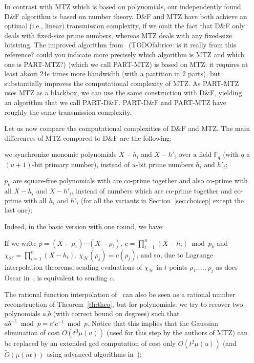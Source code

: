 \documentclass[twoside,envcountsame,runningheads]{llncs}
\newcommand{\Oapp}{\ensuremath{\tilde{O}}}
\newcommand{\Set}{\mathcal{H}}
\newcommand{\df}{D\&F\xspace}
\begin{document}
In contrast with MTZ which is based on polynomials, our
independently found \df algorithm is based on number theory.
\df and MTZ have both achieve an optimal (i.e., linear) transmission complexity, if we omit the fact
that \df only deals with fixed-size prime numbers, whereas MTZ deals with any fixed-size bitstring. The improved algorithm from~\cite{Mins1} (TODOfabrice: is it really from this reference? could you indicate more precisely which algorithm is MTZ and which one is PART-MTZ?) (which we call PART-MTZ) is based on MTZ: it requires at least about $24e$ times more bandwidth (with a partition in $2$ parts), but substantially improves the computational complexity of MTZ. As PART-MTZ uses MTZ as a blackbox, we can use the same construction with \df, yielding an algorithm that we call PART-\df. PART-\df and PART-MTZ have roughly the same transmission complexity.

Let us now compare the computational complexities of \df and MTZ. The main differences of MTZ compared to \df are the following:
\begin{compactitem}
\item we synchronize monomic polynomials $X-h_i$ and $X-h'_i$ over a field $\mathbb{F}_q$ (with $q$ a $(u+1)$-bit primary number), instead of $u$-bit prime numbers $h_i$ and $h'_i$;
\item $p_k$ are square-free polynomials with are co-prime together and also co-prime with all $X-h_i$ and $X-h'_i$, instead of numbers which are co-prime together and co-prime with all $h_i$ and $h'_i$ (for all the variants in Section~\ref{sec:choicep} except the last one);
\end{compactitem}

Indeed, in the basic version with one round, we have:
\begin{compactitem}
\item If we write $p = (X-\rho_1) \cdots (X-\rho_t)$, $c = \prod_{i=1}^n (X-h_i) \bmod p_k$ and $\chi_\Set = \prod_{i=1}^n (X-h_i)$, $\chi_\Set(\rho_j) = c(\rho_j)$, and so, due to Lagrange interpolation theorems, sending evaluations of $\chi_\Set$ in $t$ points $\rho_1,\dots,\rho_j$ as does Oscar in~\cite{Mins1}, is equivalent to sending $c$.
\item The rational function interpolation of~\cite{Mins1} can also be seen as a rational number reconstruction of Theorem~\ref{th:theo}, but for polynomials: we try to recover two polynomials $a$,$b$ (with correct bound on degrees) such that $a b^{-1} \bmod p = c' c^{-1} \bmod p$.
Notice that this implies that the Gaussian elimination of cost $O(t^3 \mu(u))$ (used for this step by the authors of MTZ) can be replaced by an extended gcd computation of cost only $O(t^2 \mu(u))$ (and $\Oapp(\mu(ut))$ using advanced algorithms in~\cite{pan2004rational,wang2003acceleration});
\end{compactitem}
\end{document}
